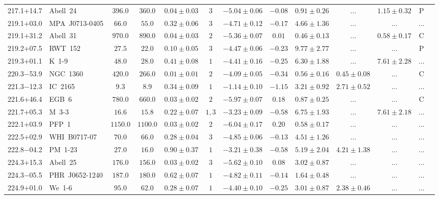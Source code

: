 \documentclass[useAMS]{mn2e}
\begin{document}
\begin{center}
{\begin{longtable}{llccccccccccc}
217.1$+$14.7&Abell~24&$     396.0$&$     360.0$&$0.04 \pm 0.03$&$3$&$-5.04 \pm 0.06$&$     -0.08$&$0.91 \pm 0.26$&$...$&$1.15 \pm 0.32$&P\\
219.1$+$03.0&MPA~J0713-0405&$      66.0$&$      55.0$&$0.32 \pm 0.06$&$3$&$-4.71 \pm 0.12$&$     -0.17$&$4.66 \pm 1.36$&$...$&$...$&...\\
219.1$+$31.2&Abell~31&$     970.0$&$     890.0$&$0.04 \pm 0.03$&$2$&$-5.36 \pm 0.07$&$      0.01$&$0.46 \pm 0.13$&$...$&$0.58 \pm 0.17$&C\\
219.2$+$07.5&RWT~152&$      27.5$&$      22.0$&$0.10 \pm 0.05$&$3$&$-4.47 \pm 0.06$&$     -0.23$&$9.77 \pm 2.77$&$...$&$...$&P\\
219.3$+$01.1&K~1-9&$      48.0$&$      28.0$&$0.41 \pm 0.08$&$1$&$-4.41 \pm 0.16$&$     -0.25$&$6.30 \pm 1.88$&$...$&$7.61 \pm 2.28$&...\\
220.3$-$53.9&NGC~1360&$     420.0$&$     266.0$&$0.01 \pm 0.01$&$2$&$-4.09 \pm 0.05$&$     -0.34$&$0.56 \pm 0.16$&$0.45 \pm 0.08$&$...$&C\\
221.3$-$12.3&IC~2165&$       9.3$&$       8.9$&$0.34 \pm 0.09$&$1$&$-1.14 \pm 0.10$&$     -1.15$&$3.21 \pm 0.92$&$2.71 \pm 0.52$&$...$&...\\
221.6$+$46.4&EGB~6&$     780.0$&$     660.0$&$0.03 \pm 0.02$&$2$&$-5.97 \pm 0.07$&$      0.18$&$0.87 \pm 0.25$&$...$&$...$&C\\
221.7$+$05.3&M~3-3&$      16.6$&$      15.8$&$0.22 \pm 0.07$&$1,3$&$-3.23 \pm 0.09$&$     -0.58$&$6.75 \pm 1.93$&$...$&$7.61 \pm 2.18$&...\\
222.1$+$03.9&PFP~1&$    1150.0$&$    1100.0$&$0.03 \pm 0.02$&$2$&$-6.04 \pm 0.17$&$      0.20$&$0.58 \pm 0.17$&$...$&$...$&...\\
222.5$+$02.9&WHI~B0717-07&$      70.0$&$      66.0$&$0.28 \pm 0.04$&$3$&$-4.85 \pm 0.06$&$     -0.13$&$4.51 \pm 1.26$&$...$&$...$&...\\
222.8$-$04.2&PM~1-23&$      27.0$&$      16.0$&$0.90 \pm 0.37$&$1$&$-3.21 \pm 0.38$&$     -0.58$&$5.19 \pm 2.04$&$4.21 \pm 1.38$&$...$&...\\
224.3$+$15.3&Abell~25&$     176.0$&$     156.0$&$0.03 \pm 0.02$&$3$&$-5.62 \pm 0.10$&$      0.08$&$3.02 \pm 0.87$&$...$&$...$&...\\
224.3$-$05.5&PHR~J0652-1240&$     187.0$&$     180.0$&$0.62 \pm 0.07$&$1$&$-4.82 \pm 0.11$&$     -0.14$&$1.64 \pm 0.48$&$...$&$...$&...\\
224.9$+$01.0&We~1-6&$      95.0$&$      62.0$&$0.28 \pm 0.07$&$1$&$-4.40 \pm 0.10$&$     -0.25$&$3.01 \pm 0.87$&$2.38 \pm 0.46$&$...$&...\\

\end{longtable}}
\end{center}
\end{document}

